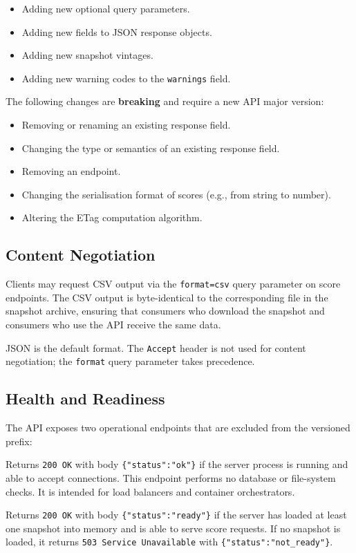 \begin{itemize}
  \item Adding new optional query parameters.
  \item Adding new fields to JSON response objects.
  \item Adding new snapshot vintages.
  \item Adding new warning codes to the \texttt{warnings} field.
\end{itemize}

The following changes are \textbf{breaking} and require a new API major
version:

\begin{itemize}
  \item Removing or renaming an existing response field.
  \item Changing the type or semantics of an existing response field.
  \item Removing an endpoint.
  \item Changing the serialisation format of scores (e.g., from string to
    number).
  \item Altering the ETag computation algorithm.
\end{itemize}

\subsection{Content Negotiation}\label{sec:api:content}

Clients may request CSV output via the \texttt{format=csv} query parameter
on score endpoints.  The CSV output is byte-identical to the corresponding
file in the snapshot archive, ensuring that consumers who download the
snapshot and consumers who use the API receive the same data.

JSON is the default format.  The \texttt{Accept} header is not used for
content negotiation; the \texttt{format} query parameter takes precedence.

\subsection{Health and Readiness}\label{sec:api:health}

The API exposes two operational endpoints that are excluded from the
versioned prefix:

\begin{description}[style=nextline]
  \item[\texttt{GET /healthz}]
    Returns \texttt{200~OK} with body \texttt{\{"status":"ok"\}} if the
    server process is running and able to accept connections.  This endpoint
    performs no database or file-system checks.  It is intended for load
    balancers and container orchestrators.
  \item[\texttt{GET /readyz}]
    Returns \texttt{200~OK} with body \texttt{\{"status":"ready"\}} if
    the server has loaded at least one snapshot into memory and is able to
    serve score requests.  If no snapshot is loaded, it returns
    \texttt{503~Service Unavailable} with
    \texttt{\{"status":"not\_ready"\}}.
\end{description}

